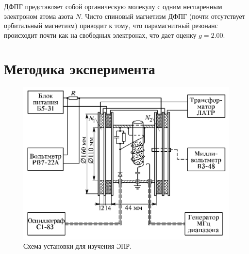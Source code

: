 \documentclass[12pt,a4paper]{article}
\begin{document}
	ДФПГ представляет собой органическую молекулу с одним неспаренным электроном атома азота $N$. Чисто спиновый магнетизм ДФПГ (почти отсутствует орбитальный магнетизм) приводит к тому, что парамагнитный резонанс происходит почти как на свободных электронах, что дает оценку $g = 2.00$.
	
	\section*{Методика эксперимента}
	
	\begin{figure}[H]
		\centering
		\includegraphics[width=0.6\linewidth]{res/scheme.png}
		\caption{Схема установки для изучения ЭПР.}
		\label{fig:setup}
	\end{figure}
	
\end{document}
